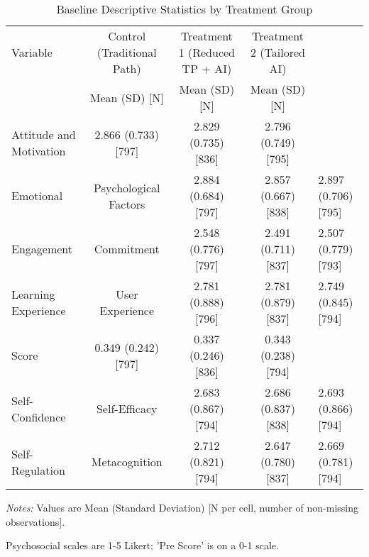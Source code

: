 \begin{table}[htbp]
\centering
\begin{threeparttable}
\caption{Baseline Descriptive Statistics by Treatment Group}
\label{tab:baseline_descriptives_final}
\scriptsize
\begin{tabular}{@{}lccc@{}}
\toprule
Variable & Control (Traditional Path) & Treatment 1 (Reduced TP + AI) & Treatment 2 (Tailored AI) \\
 & Mean (SD) [N] & Mean (SD) [N] & Mean (SD) [N]  \\
\midrule
Attitude and Motivation & 2.866 (0.733) [797] & 2.829 (0.735) [836] & 2.796 (0.749) [795]  \\
Emotional & Psychological Factors & 2.884 (0.684) [797] & 2.857 (0.667) [838] & 2.897 (0.706) [795]  \\
Engagement & Commitment & 2.548 (0.776) [797] & 2.491 (0.711) [837] & 2.507 (0.779) [793]  \\
Learning Experience & User Experience & 2.781 (0.888) [796] & 2.781 (0.879) [837] & 2.749 (0.845) [794]  \\
Score & 0.349 (0.242) [797] & 0.337 (0.246) [836] & 0.343 (0.238) [794]  \\
Self-Confidence & Self-Efficacy & 2.683 (0.867) [794] & 2.686 (0.837) [838] & 2.693 (0.866) [794]  \\
Self-Regulation & Metacognition & 2.712 (0.821) [794] & 2.647 (0.780) [837] & 2.669 (0.781) [794]  \\
\bottomrule
\end{tabular}
\begin{tablenotes}
  \item[] \textit{Notes:} Values are Mean (Standard Deviation) [N per cell, number of non-missing observations].
  \item[] Psychosocial scales are 1-5 Likert; 'Pre Score' is on a 0-1 scale.
\end{tablenotes}
\end{threeparttable}
\end{table}
